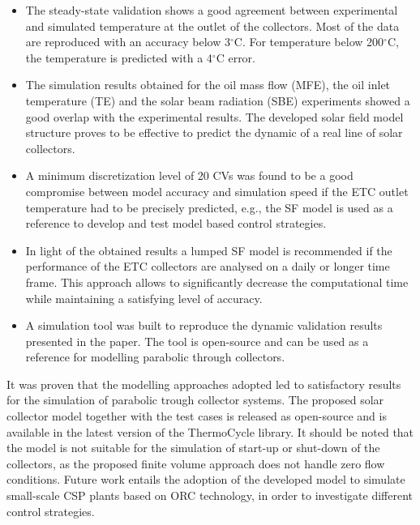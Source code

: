 \documentclass[final,3p,times,review]{elsarticle}
\begin{document}
\begin{itemize}
\item The steady-state validation shows a good agreement between experimental and simulated temperature at the outlet of the collectors. Most of the data are reproduced with an accuracy below 3$^{\circ}$C. For temperature below 200$^{\circ}$C, the temperature is predicted with a  4$^{\circ}$C error.
\item The simulation results obtained for the oil mass flow   (MFE), the oil inlet temperature   (TE) and the solar  beam radiation (SBE) experiments showed a good overlap with the experimental results. The developed solar field model structure proves to be effective to predict the dynamic of a real line of solar collectors.
%
%
\item A minimum discretization level of 20 CVs was found to be a good compromise between model accuracy and simulation speed if the ETC outlet temperature had to be precisely predicted, e.g., the  SF model is used as a reference to develop and test model based control strategies.
%
\item In light of the obtained results a lumped SF model is recommended if the performance of the ETC collectors are analysed on a daily or longer time frame. This approach allows to significantly decrease the computational time while maintaining a satisfying level of accuracy.
%
\item A simulation tool was built to reproduce the dynamic validation results presented in the paper. The tool is open-source and can be used as a reference for modelling parabolic through collectors.
\end{itemize}
%
It was proven that the modelling approaches adopted led to satisfactory results for the simulation of parabolic trough collector systems. The proposed solar collector model together with the test cases is released as open-source and is available in the latest version of the ThermoCycle library. It should be noted that the model is not suitable for the simulation of start-up or shut-down of the collectors, as the proposed finite volume approach does not handle zero flow conditions. Future work entails the adoption of the developed model to simulate small-scale CSP plants based on ORC technology, in order to investigate different control strategies.
%
%
%
\end{document}
